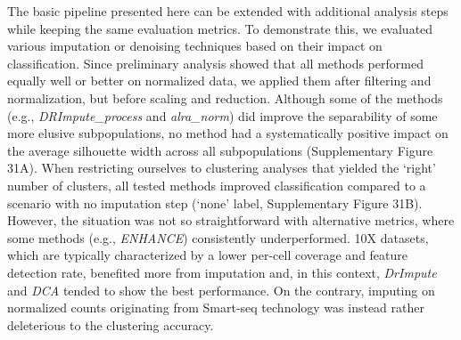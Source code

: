 \documentclass[11pt]{article}
\begin{document}
The basic pipeline presented here can be extended with additional analysis steps while keeping the same evaluation metrics. To demonstrate this, we evaluated various imputation or denoising techniques based on their impact on classification. Since preliminary analysis showed that all methods performed equally well or better on normalized data, we applied them after filtering and normalization, but before scaling and reduction. Although some of the methods (e.g., \textit{DRImpute\_process} and \textit{alra\_norm}) did improve the separability of some more elusive subpopulations, no method had a systematically positive impact on the average silhouette width across all subpopulations (Supplementary Figure 31A). When restricting ourselves to clustering analyses that yielded the `right' number of clusters, all tested methods improved classification  compared to a scenario with no imputation step (`none' label, Supplementary Figure 31B). However, the situation was not so straightforward with alternative metrics, where some methods (e.g., \textit{ENHANCE}) consistently underperformed. 10X datasets, which are typically characterized by a lower per-cell coverage and feature detection rate, benefited more from imputation and, in this context, \textit{DrImpute} and \textit{DCA} tended to show the best performance. On the contrary, imputing on normalized counts originating from Smart-seq technology was instead rather deleterious to the clustering accuracy. 
\end{document}
